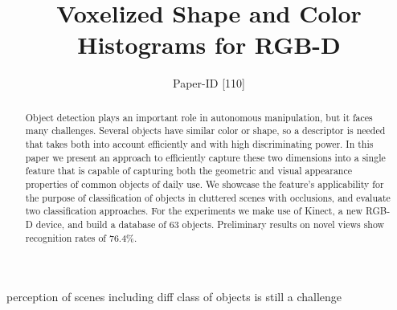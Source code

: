 \documentclass[conference]{sty/IEEEtran}
\begin{document}
\title{Voxelized Shape and Color Histograms for RGB-D}

\author{Paper-ID [110]}


\newcommand{\todo}[1]{\textbf{\textcolor{red}{TODO: #1}}}
\maketitle

\begin{abstract}
Object detection plays an important role in autonomous manipulation,
but it faces many challenges. Several objects have similar color
or shape, so a descriptor is needed that takes both into account
efficiently and with high discriminating power. In this paper we
present an approach to efficiently capture these two dimensions
into a single feature
that is capable of capturing both the geometric and visual appearance
properties of common objects of daily use. We showcase the
feature's applicability for the purpose of classification of objects in cluttered scenes with occlusions,
and evaluate two classification approaches.
For the experiments we make use of Kinect, a new RGB-D device,
and build a database of 63 objects. Preliminary results
on novel views show recognition rates of 76.4\%.
\end{abstract}

\IEEEpeerreviewmaketitle

perception of scenes including diff class of objects is still a challenge
\end{document}
